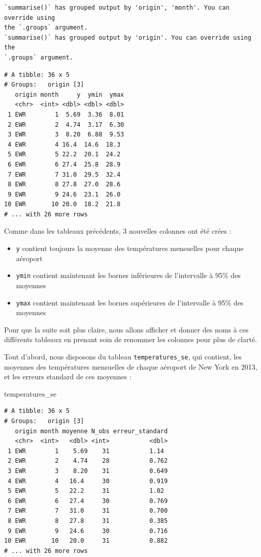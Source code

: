 \documentclass[
  a4paper,
  DIV=11,
  numbers=noendperiod,
  oneside]{scrreprt}
\newenvironment{Shaded}{}{}
\newcommand{\NormalTok}[1]{\textcolor[rgb]{0.14,0.16,0.18}{#1}}
\providecommand{\tightlist}{%
  \setlength{\itemsep}{0pt}\setlength{\parskip}{0pt}}\usepackage{longtable,booktabs,array}
\begin{document}
\begin{verbatim}
`summarise()` has grouped output by 'origin', 'month'. You can override using
the `.groups` argument.
`summarise()` has grouped output by 'origin'. You can override using the
`.groups` argument.
\end{verbatim}

\begin{verbatim}
# A tibble: 36 x 5
# Groups:   origin [3]
   origin month     y  ymin  ymax
   <chr>  <int> <dbl> <dbl> <dbl>
 1 EWR        1  5.69  3.36  8.01
 2 EWR        2  4.74  3.17  6.30
 3 EWR        3  8.20  6.88  9.53
 4 EWR        4 16.4  14.6  18.3 
 5 EWR        5 22.2  20.1  24.2 
 6 EWR        6 27.4  25.8  28.9 
 7 EWR        7 31.0  29.5  32.4 
 8 EWR        8 27.8  27.0  28.6 
 9 EWR        9 24.6  23.1  26.0 
10 EWR       10 20.0  18.2  21.8 
# ... with 26 more rows
\end{verbatim}

Comme dans les tableaux précédents, 3 nouvelles colonnes ont été crées :

\begin{itemize}
\tightlist
\item
  \texttt{y} contient toujours la moyenne des températures mensuelles
  pour chaque aéroport
\item
  \texttt{ymin} contient maintenant les bornes inférieures de
  l'intervalle à 95\% des moyennes
\item
  \texttt{ymax} contient maintenant les bornes supérieures de
  l'intervalle à 95\% des moyennes
\end{itemize}

Pour que la suite soit plus claire, nous allons afficher et donner des
noms à ces différents tableaux en prenant soin de renommer les colonnes
pour plus de clarté.

Tout d'abord, nous disposons du tableau \texttt{temperatures\_se}, qui
contient, les moyennes des températures mensuelles de chaque aéroport de
New York en 2013, et les erreurs standard de ces moyennes :

\begin{Shaded}
\begin{Highlighting}[]
\NormalTok{temperatures\_se}
\end{Highlighting}
\end{Shaded}

\begin{verbatim}
# A tibble: 36 x 5
# Groups:   origin [3]
   origin month moyenne N_obs erreur_standard
   <chr>  <int>   <dbl> <int>           <dbl>
 1 EWR        1    5.69    31           1.14 
 2 EWR        2    4.74    28           0.762
 3 EWR        3    8.20    31           0.649
 4 EWR        4   16.4     30           0.919
 5 EWR        5   22.2     31           1.02 
 6 EWR        6   27.4     30           0.769
 7 EWR        7   31.0     31           0.700
 8 EWR        8   27.8     31           0.385
 9 EWR        9   24.6     30           0.716
10 EWR       10   20.0     31           0.882
# ... with 26 more rows
\end{verbatim}
\end{document}
